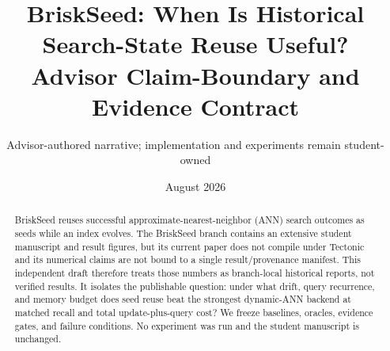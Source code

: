 \documentclass[10pt]{article}
\title{BriskSeed: When Is Historical Search-State Reuse Useful?\\\large Advisor Claim-Boundary and Evidence Contract}
\author{Advisor-authored narrative; implementation and experiments remain student-owned}
\date{August 2026}
\begin{document}
\maketitle
\begin{abstract}
BriskSeed reuses successful approximate-nearest-neighbor (ANN) search outcomes as seeds while an index evolves.  The BriskSeed branch contains an extensive student manuscript and result figures, but its current paper does not compile under Tectonic and its numerical claims are not bound to a single result/provenance manifest.  This independent draft therefore treats those numbers as branch-local historical reports, not verified results.  It isolates the publishable question: under what drift, query recurrence, and memory budget does seed reuse beat the strongest dynamic-ANN backend at matched recall and total update-plus-query cost?  We freeze baselines, oracles, evidence gates, and failure conditions.  No experiment was run and the student manuscript is unchanged.
\end{abstract}
\small
\end{document}

